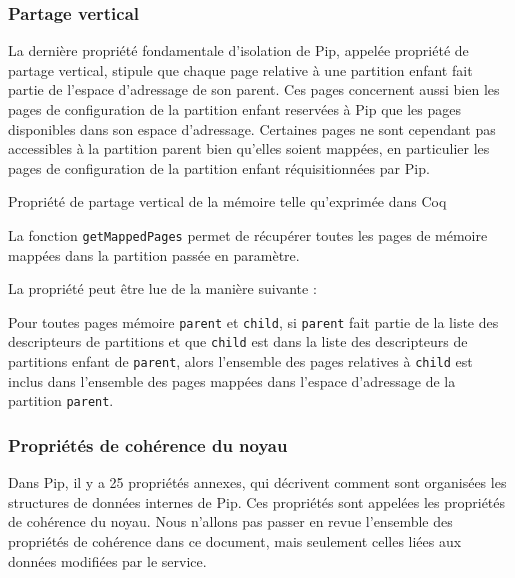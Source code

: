 			\subsubsection{Partage vertical}

			La dernière propriété fondamentale d'isolation de Pip, appelée propriété de partage vertical, stipule que chaque page relative à une partition enfant fait partie de l'espace d'adressage de son parent. Ces pages concernent aussi bien les pages de configuration de la partition enfant reservées à Pip que les pages disponibles dans son espace d'adressage. Certaines pages ne sont cependant pas accessibles à la partition parent bien qu'elles soient mappées, en particulier les pages de configuration de la partition enfant réquisitionnées par Pip.

			\begin{listing}[!ht]
				\caption{Propriété de partage vertical de la mémoire telle qu'exprimée dans Coq}
				\label{code:vertical_sharing}
			\end{listing}

			La fonction \texttt{getMappedPages} permet de récupérer toutes les pages de mémoire mappées dans la partition passée en paramètre.

			La propriété peut être lue de la manière suivante :

			\begin{theorem}
				Pour toutes pages mémoire \texttt{parent} et \texttt{child}, si \texttt{parent} fait partie de la liste des descripteurs de partitions et que \texttt{child} est dans la liste des descripteurs de partitions enfant de \texttt{parent}, alors l'ensemble des pages relatives à \texttt{child} est inclus dans l'ensemble des pages mappées dans l'espace d'adressage de la partition \texttt{parent}.
			\end{theorem}

			\subsubsection{Propriétés de cohérence du noyau}

			Dans Pip, il y a 25 propriétés annexes, qui décrivent comment sont organisées les structures de données internes de Pip. Ces propriétés sont appelées les propriétés de cohérence du noyau. Nous n'allons pas passer en revue l'ensemble des propriétés de cohérence dans ce document, mais seulement celles liées aux données modifiées par le service.

